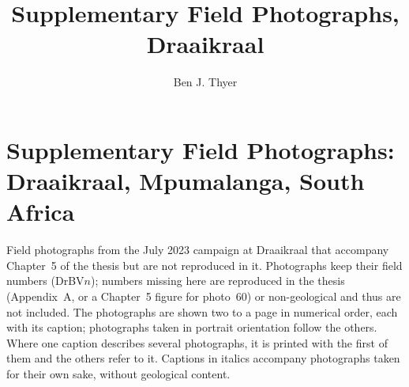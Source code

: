 \documentclass{caltech_thesis}
\title{Supplementary Field Photographs, Draaikraal}
\author{Ben J. Thyer}
\begin{document}
\mainmatter
\pagestyle{plain}
\chapter*{Supplementary Field Photographs: Draaikraal, Mpumalanga, South Africa}

Field photographs from the July 2023 campaign at Draaikraal that accompany
Chapter~5 of the thesis but are not reproduced in it. Photographs keep their
field numbers (DrBV$n$); numbers missing here are reproduced in the thesis
(Appendix~A, or a Chapter~5 figure for photo~60) or non-geological and thus are not included. The
photographs are shown two to a page in numerical order, each with its caption;
photographs taken in portrait orientation follow the others. Where one caption
describes several photographs, it is printed with the first of them and the
others refer to it. Captions in italics accompany photographs taken for their own sake,
without geological content.




\printbibliography[heading=bibintoc, title={References}]
\end{document}

